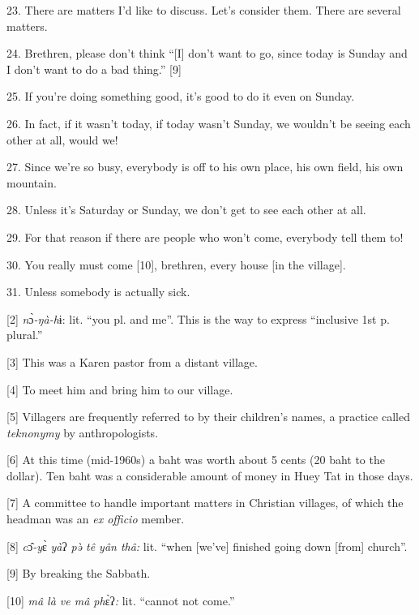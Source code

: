 {23. There are matters I'd like to discuss. Let's consider them. There are
several matters.}

{24. Brethren, please don't think ``[I] don't want to go, since today is
Sunday and I don't want to do a bad thing.'' [9]}

{25. If you're doing something good, it's good to do it even on Sunday.}

{26. In fact, if it wasn't today, if today wasn't Sunday, we wouldn't be
seeing each other at all, would we!}

{27. Since we're so busy, everybody is off to his own place, his own field,
his own mountain.}

{28. Unless it's Saturday or Sunday, we don't get to see each other at all.}

{29. For that reason if there are people who won't come, everybody tell
them to!}

{30. You really must come [10], brethren, every house [in the village].}

{31. Unless somebody is actually sick.}

{[2] }{\textit{n}}{ɔ̀}{\textit{-ŋà-h}}{ɨ:
lit. ``you pl. and me''. This is the way to express ``inclusive 1st p. plural.''}

{[3] This was a Karen pastor from a distant village.}

{[4] To meet him and bring him to our village.}

{[5] Villagers are frequently referred to by their children's names, a practice
called }{\textit{teknonymy}}{ by anthropologists.}

{[6] At this time (mid-1960s) a baht was worth about 5 cents (20 baht to
the dollar). Ten baht was a considerable amount of money in Huey Tat in those days.}

{[7] A committee to handle important matters in Christian villages, of which
the headman was an }{\textit{ex officio}}{ member.}

{[8] }{\textit{c}}{ɔ̂}{\textit{-y}}{ɛ̀}{\textit{
yà}}{ʔ}{\textit{ pə̀ tê yân thâ:}}{ lit. ``when [we've]
finished going down [from] church''.}

{[9] By breaking the Sabbath.}

{[10] }{\textit{mâ là ve mâ ph}}{ɛ̀ʔ}{\textit{:}}{
lit. ``cannot not come.''}


